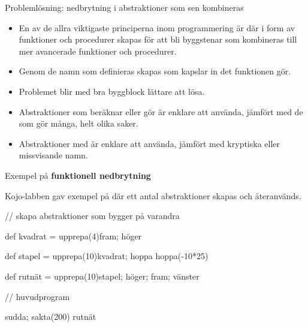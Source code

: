 \begin{Slide}{Problemlösning: nedbrytning i abstraktioner som sen kombineras}\SlideFontSmall
\begin{itemize}
\item En av de allra viktigaste principerna inom programmering är  där   i form av funktioner och procedurer skapas för att bli byggstenar som kombineras till mer avancerade funktioner och procedurer.

\item Genom de namn som definieras skapas  som kapslar in det funktionen gör.

\item Problemet blir med bra byggblock lättare att lösa.

\item Abstraktioner som beräknar eller gör  är enklare att använda, jämfört med de som gör många, helt olika saker.

\item Abstraktioner med  är enklare att använda, jämfört med kryptiska eller missvisande namn.
\end{itemize}

\end{Slide}



\begin{Slide}{Exempel på \textbf{funktionell nedbrytning}}

Kojo-labben gav exempel på  där ett antal abstraktioner skapas och återanvänds.

\begin{Code}
// skapa abstraktioner som bygger på varandra

def kvadrat = upprepa(4){fram; höger}

def stapel = {
  upprepa(10){kvadrat; hoppa}
  hoppa(-10*25)
}

def rutnät = upprepa(10){stapel; höger; fram; vänster}

// huvudprogram

sudda; sakta(200)
rutnät
\end{Code}
\end{Slide}


